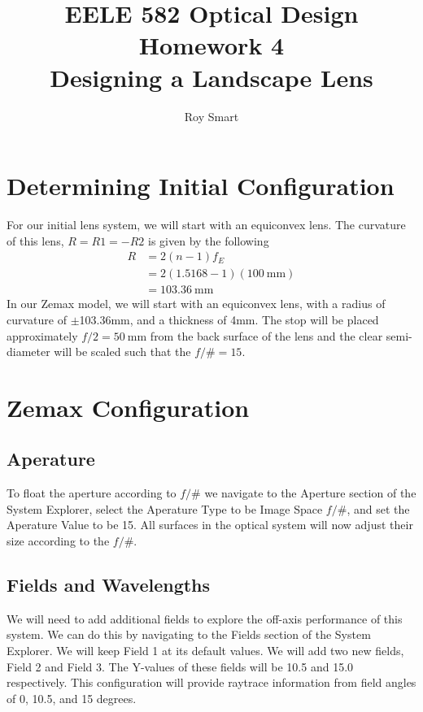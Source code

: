 \documentclass[10pt,a4paper]{article}
\title{EELE 582 Optical Design \\ Homework 4 \\Designing a Landscape Lens }
\author{Roy Smart}
\begin{document}
	
\maketitle	

\section{Determining Initial Configuration} \label{init}

	For our initial lens system, we will start with an equiconvex lens. The curvature of this lens, $R=R1=-R2$ is given by the following
	\begin{align*}
		R &=2 (n - 1) f_E \\
		&= 2 (1.5168 - 1) (\SI{100}{\milli\meter}) \\
		&= \SI{103.36}{\milli\meter}
	\end{align*}
	In our Zemax model, we will start with an equiconvex lens, with a radius of curvature of $\pm$103.36mm, and a thickness of 4mm. The stop will be placed approximately $f/2=\SI{50}{\milli \meter}$ from the back surface of the lens and the clear semi-diameter will be scaled such that the $f/\# = 15$.

\section{Zemax Configuration}
	\subsection{Aperature} \label{aper}
	
		To float the aperture according to  $f/\#$ we navigate to the Aperture section of the System Explorer, select the Aperature Type to be Image Space $f/\#$, and set the Aperature Value to be 15. All surfaces in the optical system will now adjust their size according to the $f/\#$.

	\subsection{Fields and Wavelengths}
	
		We will need to add additional fields to explore the off-axis performance of this system. We can do this by navigating to the Fields section of the System Explorer. We will keep Field 1 at its default values. We will add two new fields, Field 2 and Field 3. The Y-values of these fields will be 10.5 and 15.0 respectively. This configuration will provide raytrace information from field angles of 0, 10.5, and 15 degrees.
		
\end{document}
